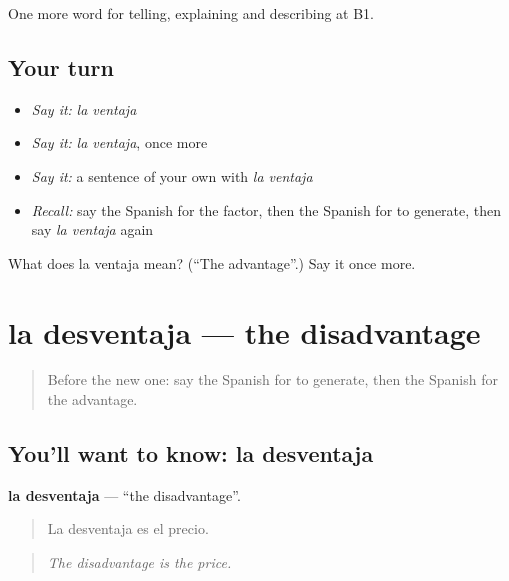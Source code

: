 \begin{grammarlens}[title={What you've built}]
One more word for telling, explaining and describing at B1.
\end{grammarlens}

\subsection*{Your turn}
\begin{itemize}
\raggedright
  \item \emph{Say it:} \emph{la ventaja}
  \item \emph{Say it:} \emph{la ventaja}, once more
  \item \emph{Say it:} a sentence of your own with \emph{la ventaja}
  \item \emph{Recall:} say the Spanish for the factor, then the Spanish for to generate, then say \emph{la ventaja} again
\end{itemize}

\begin{tcolorbox}[breakable,colback=teal!4,colframe=teal!35!black,title={Before you move on}]
What does la ventaja mean? (\textquotedblleft{}The advantage\textquotedblright{}.) Say it once more.
\end{tcolorbox}
\section[la desventaja]{la desventaja — the disadvantage}

\label{lesson:ES-C584-desventaja}



\begin{quote}
Before the new one: say the Spanish for to generate, then the Spanish for the advantage.
\end{quote}

\subsection*{You'll want to know: la desventaja}
\textbf{la desventaja} — \textquotedblleft{}the disadvantage\textquotedblright{}.

\begin{quote}
La desventaja es el precio.
\end{quote}

\begin{quote}
\emph{The disadvantage is the price.}
\end{quote}

